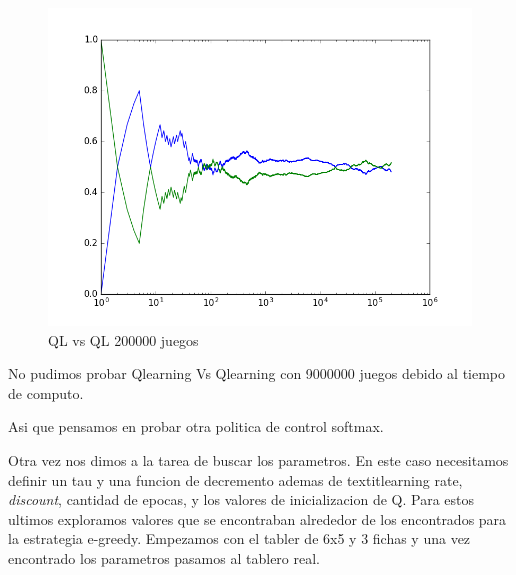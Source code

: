 \begin{figure}[h]
 \centering
 \begin{minipage}{.45\textwidth}
	\centering
	\includegraphics[scale=0.35]{img/QlearningQlearningEgreedy2000007x6(4).png}
       \caption{QL vs QL 200000 juegos}
  \end{minipage}
\end{figure}

No pudimos probar Qlearning Vs Qlearning con 9000000 juegos debido al tiempo de computo.


Asi que pensamos en probar otra politica de control softmax.

Otra vez nos dimos a la tarea de buscar los parametros. En este caso necesitamos definir un tau y una funcion de decremento
 ademas de textit{learning rate}, \textit{discount}, cantidad de epocas, y los valores de inicializacion de Q. Para estos ultimos exploramos valores que se encontraban alrededor de los encontrados para la estrategia e-greedy.
Empezamos con el tabler de 6x5 y 3 fichas y una vez encontrado los parametros pasamos al tablero real.






